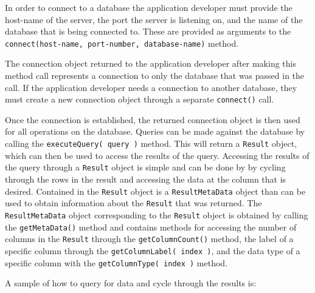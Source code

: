 \documentclass[letterpaper, 12pt]{article}
\begin{document}
  In order to connect to a database the application developer must provide the 
  host-name of the server, the port the server is listening on, and the name of the
  database that is being connected to. These are provided as arguments to the 
  \lstinline[basicstyle=\ttfamily]|connect(host-name, port-number, database-name)|
  method. 
  \par\vspace{\baselineskip}  
  The connection object returned to the application developer after making this method
  call represents a connection to only the database that was passed in the call. If the 
  application developer needs a connection to another database, they must create a new
  connection object through a separate
  \lstinline[basicstyle=\ttfamily]|connect()| call. 
  \par\vspace{\baselineskip}
  Once the connection is established, the returned connection object is then used for all
  operations on the database. Queries can be made against the database by calling 
  the \lstinline[basicstyle=\ttfamily]|executeQuery( query )|
  method. This will return a \lstinline[basicstyle=\ttfamily]|Result| object, which can 
  then be used to access the results of the query. Accessing the results of the query
  through a \lstinline[basicstyle=\ttfamily]|Result| object is simple and can be done by 
  by cycling through the rows in the result and accessing the data at the column that 
  is desired. Contained in the \lstinline[basicstyle=\ttfamily]|Result| object is a 
  \lstinline[basicstyle=\ttfamily]|ResultMetaData| object than can be used to obtain 
  information about the \lstinline[basicstyle=\ttfamily]|Result| that was returned.
  The \lstinline[basicstyle=\ttfamily]|ResultMetaData| object corresponding to the 
  \lstinline[basicstyle=\ttfamily]|Result| object is obtained by calling the 
  \lstinline[basicstyle=\ttfamily]|getMetaData()| method and contains
  methods for accessing the number of columns in the 
  \lstinline[basicstyle=\ttfamily]|Result| through the 
  \lstinline[basicstyle=\ttfamily]|getColumnCount()| method, the
  label of a specific column through the
  \lstinline[basicstyle=\ttfamily]|getColumnLabel( index )|, 
  and the data type of a specific column with the
  \lstinline[basicstyle=\ttfamily]|getColumnType( index )| method.
  \par\vspace{\baselineskip}
  A sample of how to query for data and cycle through the results is: 
  
\end{document}
